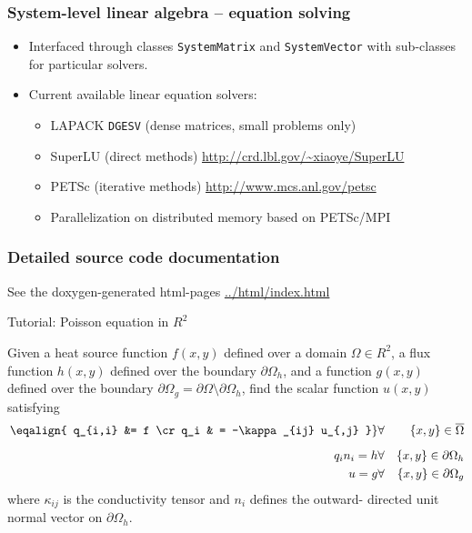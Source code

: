 \documentclass{beamer}
\begin{document}
\frame %
{
 \frametitle{System-level linear algebra -- equation solving}

 \begin{itemize}
  \item Interfaced through classes {\color{red}\tt SystemMatrix} and
        {\color{red}\tt SystemVector} with sub-classes for particular solvers.
  \vskip5pt
  \item Current available linear equation solvers:
  \begin{itemize}
   \item LAPACK {\tt DGESV} (dense matrices, small problems only)
   \item SuperLU (direct methods)
         \hfill{\scriptsize\url{http://crd.lbl.gov/~xiaoye/SuperLU}}
   \item PETSc (iterative methods)
         \hfill{\scriptsize\url{http://www.mcs.anl.gov/petsc}}
   \item Parallelization on distributed memory based on PETSc/MPI
  \end{itemize}
 \end{itemize}
}

\frame %
{
 \frametitle{Detailed source code documentation}

 See the doxygen-generated html-pages \url{../html/index.html}
}

\frame %
{
 \begin{center}
  \huge\color{blue} Tutorial: Poisson equation in $R^2$
 \end{center}

 Given a heat source function $f(x,y)$ defined over a domain
 $\Omega\in R^2$, a flux function $h(x,y)$ defined over the boundary
 $\partial\Omega_h$, and a function $g(x,y)$ defined over the boundary
 $\partial\Omega_g = \partial\Omega\setminus\partial\Omega_h$,
 find the scalar function $u(x,y)$ satisfying
 \begin{eqnarray}
  \left.\eqalign{
  q_{i,i} &= f \cr
  q_i & = -\kappa_{ij} u_{,j}
  }\right\} &\forall& \{x,y\}\in\overline{\Omega} \\[2mm]
  q_i n_i = h &\forall& \{x,y\}\in\partial\Omega_h \\
  u = g &\forall&\{x,y\}\in\partial\Omega_g
 \end{eqnarray}
 where $\kappa_{ij}$ is the conductivity tensor and $n_i$ defines the outward-
 directed unit normal vector on $\partial\Omega_h$.
}
\end{document}
